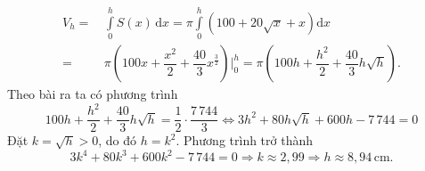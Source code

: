 \begin{bt}
{\begin{align*}
			V_h =&\, \displaystyle\int\limits_0^h S(x)\mathrm{\,d}x =\pi \displaystyle\int\limits_0^h \left(100+20\sqrt{x}+x\right)\mathrm{d}x\\
			=&\, \pi\left(100x +\dfrac{x^2}{2} +\dfrac{40}{3}x^{\tfrac{3}{2}}\right)\bigg|_0^h=\pi\left(100h + \dfrac{h^2}{2} + \dfrac{40}{3}h\sqrt{h}\right).
		\end{align*}
		Theo bài ra ta có phương trình
		\[100h + \dfrac{h^2}{2} + \dfrac{40}{3}h\sqrt{h}=\dfrac{1}{2} \cdot\dfrac{7\,744}{3} \Leftrightarrow 3h^2+80h\sqrt{h}+600h-7\,744=0\]
		Đặt $k = \sqrt{h}>0$, do đó $h = k^2$. Phương trình trở thành $$3k^4 +80k^3+ 600k^2 - 7\,744 = 0\Rightarrow k\approx2{,}99\Rightarrow h\approx 8{,}94 \,\mathrm{cm}.$$
	}
\end{bt}

